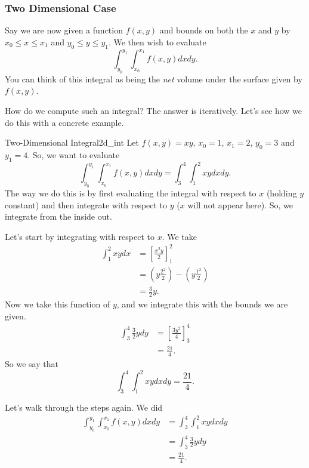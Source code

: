              	        \subsubsection{Two Dimensional Case}

             	        Say we are now given a function $f(x,y)$ and bounds on both the $x$ and $y$ by
             	        $x_0 \leq x \leq x_1$ and $y_0 \leq y \leq y_1$.  We then wish to evaluate
             	        \[
             	        \int_{y_0}^{y_1} \int_{x_0}^{x_1} f(x,y)dxdy.
             	        \]
             	        You can think of this integral as being the \emph{net} volume under the surface given by $f(x,y)$.

             	        How do we compute such an integral? The answer is iteratively.  Let's see how we do this with a concrete example.

             	        \begin{ex}{Two-Dimensional Integral}{2d_int}
             	        Let $f(x,y)=xy$, $x_0=1$, $x_1=2$, $y_0=3$ and $y_1=4$.  So, we want to evaluate
             	        \[
             	        \int_{y_0}^{y_1}\int_{x_0}^{x_1} f(x,y)dxdy = \int_3^4 \int_1^2 xy dxdy.
             	        \]
             	        The way we do this is by first evaluating the integral with respect to $x$ (holding $y$ constant) and then integrate with respect to $y$ ($x$ will not appear here). So, we integrate from the inside out.

             	        Let's start by integrating with respect to $x$. We take
             	        \begin{align*}
             	            \int_1^2 xy dx &= \left[ \frac{x^2y}{2}\right]_1^2\\
             	            &= \left( y\frac{2^2}{2}\right) - \left(y\frac{1^2}{2}\right)\\
             	            &=\frac{3}{2}y.
             	        \end{align*}
             	        Now we take this function of $y$, and we integrate this with the bounds we are given.
             	        \begin{align*}
             	            \int_3^4 \frac{3}{2}y dy &= \left[ \frac{3y^2}{4} \right]_3^4\\
             	            &= \frac{21}{4}.
             	        \end{align*}
             	        So we say that
             	        \[
             	        \int_3^4 \int_1^2 xy dxdy = \frac{21}{4}.
             	        \]

             	        Let's walk through the steps again. We did
             	        \begin{align*}
             	            \int_{y_0}^{y_1} \int_{x_0}^{x_1} f(x,y)dxdy&= \int_3^4\int_1^2 xy dxdy\\
             	            &= \int_3^4 \frac{3}{2}ydy \\
             	            &= \frac{21}{4}.
             	        \end{align*}
             	        \end{ex}

